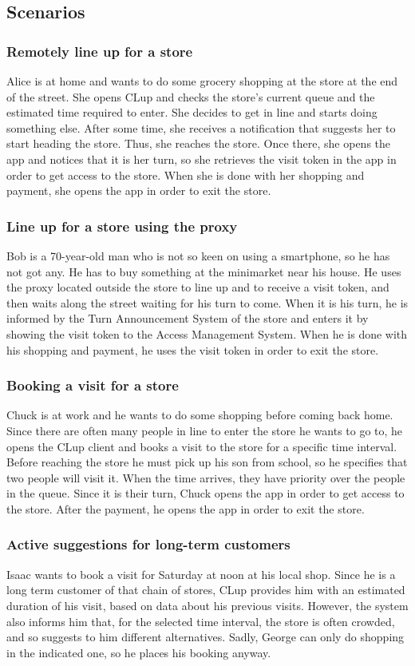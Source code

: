 \documentclass[a4paper,oneside,11pt]{book}   %
\begin{document}
    \subsection{Scenarios}
        \subsubsection{Remotely line up for a store}
        Alice is at home and wants to do some grocery shopping at the store at the end of the street. She opens CLup and checks the store’s current queue and the estimated time required to enter. She decides to get in line and starts doing something else. After some time, she receives a notification that suggests her to start heading the store. Thus, she reaches the store. Once there, she opens the app and notices that it is her turn,  so she retrieves the visit token in the app in order to get access to the store. When she is done with her shopping and payment, she opens the app in order to exit the store.
        \subsubsection{Line up for a store using the proxy}
        Bob is a 70-year-old man who is not so keen on using a smartphone, so he has not got any. He has to buy something at the minimarket near his house. He uses the proxy located outside the store to line up and to receive a visit token, and then waits along the street waiting for his turn to come. When it is his turn, he is informed by the Turn Announcement System of the store and enters it by showing the visit token to the Access Management System.  When he is done with his shopping and payment, he uses the visit token in order to exit the store.
        \subsubsection{Booking a visit for a store}
        Chuck is at work and he wants to do some shopping before coming back home. Since there are often many people in line to enter the store he wants to go to, he opens the CLup client and books a visit to the store for a specific time interval. Before reaching the store he must pick up his son from school, so he specifies that two people will visit it. When the time arrives, they have priority over the people in the queue. Since it is their turn, Chuck opens the app in order to get access to the store. After the payment, he opens the app in order to exit the store.
        \subsubsection{Active suggestions for long-term customers}
        Isaac wants to book a visit for Saturday at noon at his local shop. Since he is a long term customer of that chain of stores, CLup provides him with an estimated duration of his visit, based on data about his previous visits. However, the system also informs him that, for the selected time interval, the store is often crowded, and so suggests to him different alternatives. Sadly, George can only do shopping in the indicated one, so he places his booking anyway.
\end{document}
